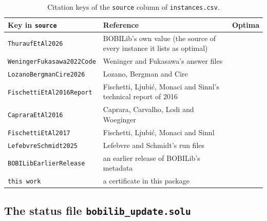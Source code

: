 \begin{table}[ht]
\centering
\small
\caption{Citation keys of the \texttt{source} column of \texttt{instances.csv}.}\label{tab:source-keys}
\begin{tabular}{@{}lll@{}}
\toprule
Key in \texttt{source} & Reference & Optima\\
\midrule
\texttt{ThuraufEtAl2026} & BOBILib's own value\cite{thurauf2026bobilib} (the source of every instance it lists as optimal) & \\
\texttt{WeningerFukasawa2022Code} & Weninger and Fukasawa's answer files\cite{weninger_bkpsolver} & \NumLitWeningerFukasawa{}\\
\texttt{LozanoBergmanCire2026} & Lozano, Bergman and Cire\cite{lozano2026network} & \NumLitLozano{}\\
\texttt{FischettiEtAl2016Report} & Fischetti, Ljubi\'c, Monaci and Sinnl's technical report of 2016\cite{fischetti2016monotonicity} & \NumLitFischettiSixteenAll{}\\
\texttt{CapraraEtAl2016} & Caprara, Carvalho, Lodi and Woeginger\cite{caprara2016bilevel} & \NumLitCaprara{}\\
\texttt{FischettiEtAl2017} & Fischetti, Ljubi\'c, Monaci and Sinnl\cite{fischetti2017new,fischetti2016appendix} & \NumLitFischettiSeventeen{}\\
\texttt{LefebvreSchmidt2025} & Lefebvre and Schmidt's run files\cite{lefebvre2025dantzig} & \NumLitLefebvreSchmidt{}\\
\texttt{BOBILibEarlierRelease} & an earlier release of BOBILib's metadata\cite{bobilib_website} & \NumLitEarlierRelease{}\\
\texttt{this work} & a certificate in this package & \NumNewOptimal{}\\
\bottomrule
\end{tabular}
\end{table}

\subsection{The status file \texttt{bobilib\_update.solu}}\label{app:data-solu}

